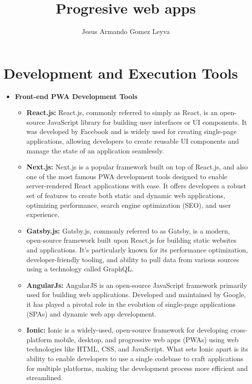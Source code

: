 \documentclass[12pt]{article}
\title{Progresive web apps}
\author{Jesus Armando Gomez Leyva}
\begin{document}
\maketitle


\section{Development and Execution Tools}


\begin{itemize}
    \item \textbf{Front-end PWA Development Tools}
        \begin{itemize}
            \item \textbf{React.js:} 
            React.js, commonly referred to simply as React, is an open-source JavaScript library for building user interfaces or UI components. It was developed by Facebook and is widely used for creating single-page applications, allowing developers to create reusable UI components and manage the state of an application seamlessly.
            \item \textbf{Next.js:} Next.js is a popular framework built on top of React.js, and also one of the most famous PWA development tools designed to enable server-rendered React applications with ease. It offers developers a robust set of features to create both static and dynamic web applications, optimizing performance, search engine optimization (SEO), and user experience.
            \item \textbf{Gatsby.js:} Gatsby.js, commonly referred to as Gatsby, is a modern, open-source framework built upon React.js for building static websites and applications. It’s particularly known for its performance optimization, developer-friendly tooling, and ability to pull data from various sources using a technology called GraphQL.
            \item \textbf{AngularJs:} AngularJS is an open-source JavaScript framework primarily used for building web applications. Developed and maintained by Google, it has played a pivotal role in the evolution of single-page applications (SPAs) and dynamic web app development.
            \item \textbf{Ionic:} Ionic is a widely-used, open-source framework for developing cross-platform mobile, desktop, and progressive web apps (PWAs) using web technologies like HTML, CSS, and JavaScript. What sets Ionic apart is its ability to enable developers to use a single codebase to craft applications for multiple platforms, making the development process more efficient and streamlined.

\end{itemize}
\end{itemize}
\end{document}
